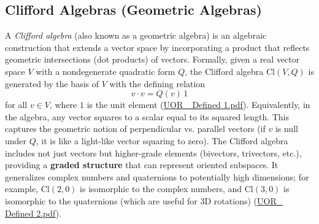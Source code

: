\documentclass[12pt]{article}
\begin{document}
\subsection{Clifford Algebras (Geometric Algebras)}

A \emph{Clifford algebra} (also known as a geometric algebra) is an algebraic construction that extends a vector space by incorporating a product that reflects geometric intersections (dot products) of vectors. Formally, given a real vector space $V$ with a nondegenerate quadratic form $Q$, the Clifford algebra $\mathrm{Cl}(V,Q)$ is generated by the basis of $V$ with the defining relation 
\[
v \cdot v = Q(v)\,1
\]
for all $v\in V$, where $1$ is the unit element (\href{file://file-XiorGa5Wu6KTrCZGytuVSc#:~:text=Clifford%20Algebras%3A%20Let%20%24V%24%20be,R%7D%5Coplus%20V%20%5Coplus%20%28V%5Cotimes}{UOR\_ Defined 1.pdf}). Equivalently, in the algebra, any vector squares to a scalar equal to its squared length. This captures the geometric notion of perpendicular vs. parallel vectors (if $v$ is null under $Q$, it is like a light-like vector squaring to zero). The Clifford algebra includes not just vectors but higher-grade elements (bivectors, trivectors, etc.), providing a \textbf{graded structure} that can represent oriented subspaces. It generalizes complex numbers and quaternions to potentially high dimensions; for example, $\mathrm{Cl}(2,0)$ is isomorphic to the complex numbers, and $\mathrm{Cl}(3,0)$ is isomorphic to the quaternions (which are useful for 3D rotations) (\href{file://file-TBF3nHDaRR5QeVMmwCFYkp#:~:text=canonical%20commutations,can%20exploit%20isomorphisms%20of%20certain}{UOR\_ Defined 2.pdf}).

\medskip
\end{document}
